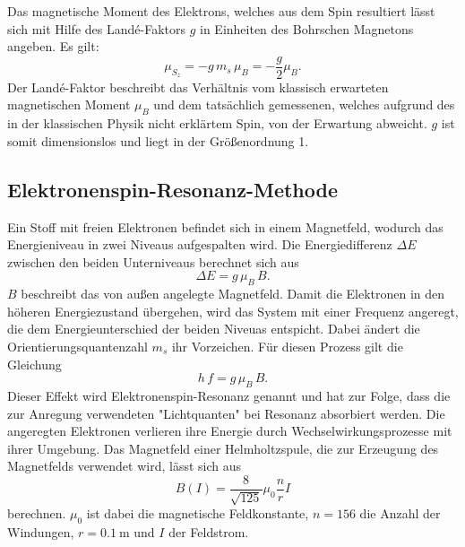 Das magnetische Moment des Elektrons, welches aus dem Spin resultiert lässt sich mit Hilfe des Landé-Faktors $g$ in Einheiten des Bohrschen Magnetons angeben. Es gilt:
\begin{equation}
  \mu_{S_z} = -g\,m_s\,\mu_B = -\frac{g}{2}\mu_B.
\end{equation}
Der Landé-Faktor beschreibt das Verhältnis vom klassisch erwarteten magnetischen Moment $\mu_B$ und dem tatsächlich gemessenen, welches aufgrund des in der klassischen Physik nicht erklärtem Spin, von der Erwartung abweicht. $g$ ist somit dimensionslos und liegt in der Größenordnung 1.

\subsection{Elektronenspin-Resonanz-Methode}
Ein Stoff mit freien Elektronen befindet sich in einem Magnetfeld, wodurch das Energieniveau in zwei Niveaus aufgespalten wird. Die Energiedifferenz $\Delta E$ zwischen den beiden Unterniveaus berechnet sich aus
\begin{equation}
  \Delta E = g\,\mu_B\,B.
\end{equation}
$B$ beschreibt das von außen angelegte Magnetfeld.
Damit die Elektronen in den höheren Energiezustand übergehen, wird das System mit einer Frequenz angeregt, die dem Energieunterschied der beiden Niveuas entspicht. Dabei ändert die Orientierungsquantenzahl $m_s$ ihr Vorzeichen. Für diesen Prozess gilt die Gleichung
\begin{equation}
\label{eqn:g}
  h\,f=g\,\mu_B\,B.
\end{equation}
Dieser Effekt wird Elektronenspin-Resonanz genannt und hat zur Folge, dass die zur Anregung verwendeten "Lichtquanten" bei Resonanz absorbiert werden. Die angeregten Elektronen verlieren ihre Energie durch Wechselwirkungsprozesse mit ihrer Umgebung.
Das Magnetfeld einer Helmholtzspule, die zur Erzeugung des Magnetfelds verwendet wird, lässt sich aus
\begin{equation}
\label{eqn:spule}
  B(I)=\frac{8}{\sqrt{125}}\mu_0\frac{n}{r}I
\end{equation}
berechnen. $\mu_0$ ist dabei die magnetische Feldkonstante, $n=156$ die Anzahl der Windungen, $r=\SI{0,1}{\meter}$ und $I$ der Feldstrom.
